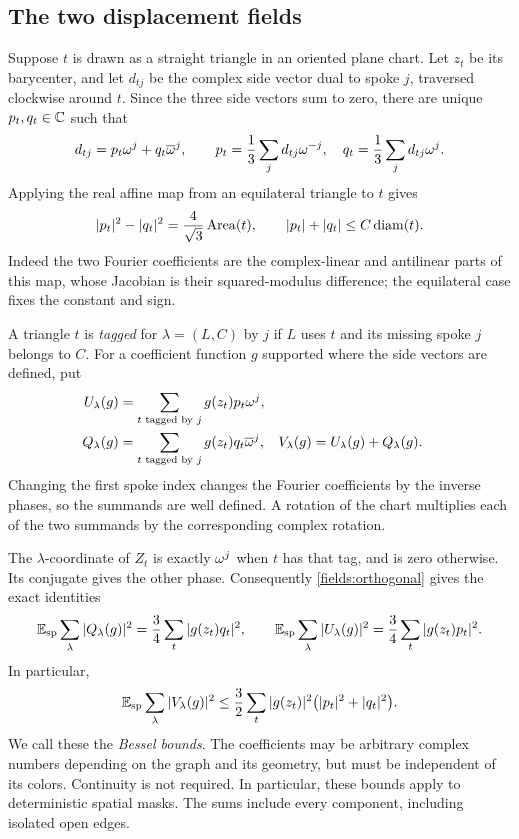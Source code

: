 \subsection{The two displacement fields}

Suppose $t$ is drawn as a straight triangle in an oriented plane chart.
Let $z_t$ be its barycenter, and let $d_{tj}$ be the complex side vector
dual to spoke $j$, traversed clockwise around $t$.  Since the three side
vectors sum to zero, there are unique $p_t,q_t\in\mathbb C$ such that
\begin{equation}\label{fields:side-decomposition}
 d_{tj}=p_t\omega^j+q_t\overline{\omega}^{j},
 \qquad
 p_t=\frac13\sum_jd_{tj}\omega^{-j},
 \quad q_t=\frac13\sum_jd_{tj}\omega^j.
\end{equation}
Applying the real affine map from an equilateral triangle to $t$ gives
\begin{equation}\label{fields:area}
 |p_t|^2-|q_t|^2=\frac4{\sqrt3}\operatorname{Area}(t),
 \qquad |p_t|+|q_t|\le C\operatorname{diam}(t).
\end{equation}
Indeed the two Fourier coefficients are the complex-linear and
antilinear parts of this map, whose Jacobian is their squared-modulus
difference; the equilateral case fixes the constant and sign.

A triangle $t$ is \emph{tagged} for $\lambda=(L,C)$ by $j$ if $L$ uses $t$
and its missing spoke $j$ belongs to $C$.  For a coefficient function $g$
supported where the side vectors are defined, put
\begin{align*}
 U_\lambda(g)&=\sum_{t\text{ tagged by }j}g(z_t)p_t\omega^j,\\
 Q_\lambda(g)&=\sum_{t\text{ tagged by }j}g(z_t)q_t\overline{\omega}^{j},
 &V_\lambda(g)&=U_\lambda(g)+Q_\lambda(g).
\end{align*}
Changing the first spoke index changes the Fourier coefficients by the
inverse phases, so the summands are well defined.  A rotation of the chart
multiplies each of the two summands by the corresponding complex rotation.

The $\lambda$-coordinate of $Z_t$ is exactly $\omega^j$ when $t$ has that tag,
and is zero otherwise.  Its conjugate gives the other phase.  Consequently
\cref{fields:orthogonal} gives the exact identities
\begin{equation}\label{fields:energy}
 \mathbb E_{\mathrm{sp}}\sum_\lambda |Q_\lambda(g)|^2
   =\frac34\sum_t|g(z_t)q_t|^2,
 \qquad
 \mathbb E_{\mathrm{sp}}\sum_\lambda |U_\lambda(g)|^2
   =\frac34\sum_t|g(z_t)p_t|^2.
\end{equation}
In particular,
\begin{equation}\label{fields:V-energy}
 \mathbb E_{\mathrm{sp}}\sum_\lambda |V_\lambda(g)|^2
 \le \frac32\sum_t|g(z_t)|^2\bigl(|p_t|^2+|q_t|^2\bigr).
\end{equation}
We call these the \emph{Bessel bounds}.  The coefficients may be arbitrary
complex numbers depending on the graph and its geometry, but must be
independent of its colors.  Continuity is not required.  In particular,
these bounds apply to deterministic spatial masks.  The sums include every
component, including isolated open edges.

